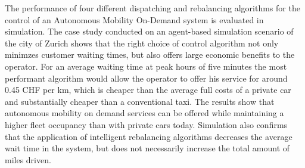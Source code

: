 The performance of four different dispatching and rebalancing algorithms for the
control of an Autonomous Mobility On-Demand system is evaluated in simulation.
The case study conducted on an agent-based simulation scenario of the city of Zurich
shows that the right choice of control algorithm not only minimzes customer waiting
times, but also offers large economic benefits to the operator. For an average
waiting time at peak hours of five minutes the most performant algorithm would allow
the operator to offer his service for around 0.45 CHF per km, which is cheaper than the average full costs of a private car and substantially cheaper than a conventional
taxi. The results show that autonomous mobility on demand services can be offered
while maintaining a higher fleet occupancy than with private cars today. Simulation
also confirms that the application of intelligent rebalancing algorithms decreases
the average wait time in the system, but does not necessarily increase the total
amount of miles driven.
